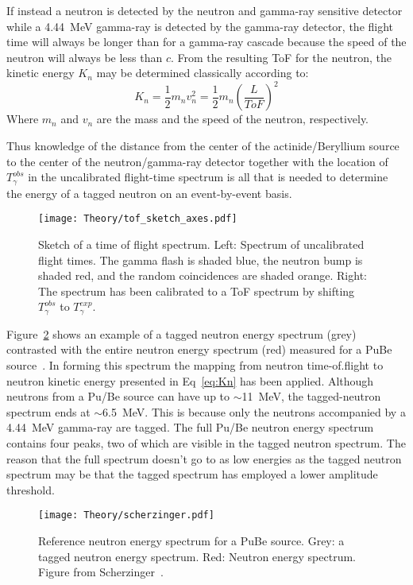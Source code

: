 \documentclass[main.tex]{subfiles}
\begin{document}
If instead a neutron is detected by the neutron and gamma-ray sensitive detector while a \SI{4.44}{\MeV} gamma-ray is detected by the gamma-ray detector, the flight time will always be longer than for a gamma-ray cascade because the speed of the neutron will always be less than $c$. From the resulting ToF for the neutron, the kinetic energy $K_n$ may be determined classically according to:
\begin{equation}
	K_n = \frac{1}{2} m_n v_n^2 = \frac{1}{2}m_n\left(\frac{L}{ToF}\right)^2
	\label{eq:Kn}
\end{equation}
Where $m_n$ and $v_n$ are the mass and the speed of the neutron, respectively.

Thus knowledge of the distance from the center of the actinide/Beryllium source to the center of the neutron/gamma-ray detector together with the location of $T_\gamma^{obs}$ in the uncalibrated flight-time spectrum is all that is needed to determine the energy of a tagged neutron on an event-by-event basis.

\begin{figure}[t]
    \centering
        \texttt{[image: Theory/tof\_sketch\_axes.pdf]}
        \caption[Sketch of a time of flight spectrum.]{Sketch of a time of flight spectrum. Left: Spectrum of uncalibrated flight times. The gamma flash is shaded blue, the neutron bump is shaded red, and the random coincidences are shaded orange. Right: The spectrum has been calibrated to a ToF spectrum by shifting $T_\gamma^{obs}$ to $T_\gamma^{exp}.$}
    \label{fig:tof_sketch} 
\end{figure}
Figure~\ref{fig:scherzinger} shows an example of a tagged neutron energy spectrum (grey) contrasted with the entire neutron energy spectrum (red) measured for a PuBe source~\cite{ScherzingerPhd}. In forming this spectrum the mapping from neutron time-of.flight to neutron kinetic energy presented in Eq~\ref{eq:Kn} has been applied. Although neutrons from a Pu/Be source can have up to $\sim$\SI{11}{\MeV}, the tagged-neutron spectrum ends at $\sim$\SI{6.5}{\MeV}. This is because only the neutrons accompanied by a \SI{4.44}{\MeV} gamma-ray are tagged. The full Pu/Be neutron energy spectrum contains four peaks, two of which are visible in the tagged neutron spectrum. The reason that the full spectrum doesn't go to as low energies as the tagged neutron spectrum may be that the tagged spectrum has employed a lower amplitude threshold.
\begin{figure}[b]
    \centering
        \texttt{[image: Theory/scherzinger.pdf]}
        \caption[Reference neutron energy spectrum]{Reference neutron energy spectrum for a PuBe source. Grey: a tagged neutron energy spectrum. Red: Neutron energy spectrum. Figure from Scherzinger~\cite{ScherzingerPhd}.}
    \label{fig:scherzinger} 
\end{figure}
\end{document}
